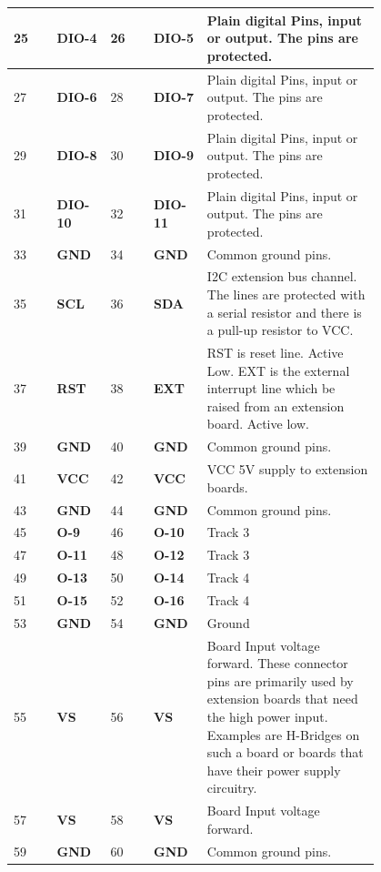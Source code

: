 \begin{longtable}{@{}|p{0.1\linewidth}|p{0.1\linewidth}|p{0.1\linewidth}|p{0.1\linewidth}|p{0.4\linewidth}|@{}}
    \midrule
    25 & \textbf{DIO-4} & 26 & \textbf{DIO-5} & Plain digital Pins, input or output. The pins are protected. \\
    \midrule
    27 & \textbf{DIO-6} & 28 & \textbf{DIO-7} & Plain digital Pins, input or output. The pins are protected. \\
    \midrule
    29 & \textbf{DIO-8} & 30 & \textbf{DIO-9} & Plain digital Pins, input or output. The pins are protected. \\
    \midrule
    31 & \textbf{DIO-10} & 32 & \textbf{DIO-11} & Plain digital Pins, input or output. The pins are protected. \\
    \midrule
    33 & \textbf{GND} & 34 & \textbf{GND} & Common ground pins. \\
    \midrule
    35 & \textbf{SCL} & 36 & \textbf{SDA} & I2C extension bus channel.  The lines are protected with a serial resistor and there is a pull-up resistor to VCC. \\
    \midrule
    37 & \textbf{RST} & 38 & \textbf{EXT} & RST is reset line. Active Low. EXT is the external interrupt line which be raised from an extension board. Active low. \\
    \midrule
    39 & \textbf{GND} & 40 & \textbf{GND} & Common ground pins. \\
    \midrule
    41 & \textbf{VCC} & 42 & \textbf{VCC} & VCC 5V supply to extension boards. \\
    \midrule
    43 & \textbf{GND} & 44 & \textbf{GND} & Common ground pins. \\
    \midrule
    45 & \textbf{O-9} & 46 & \textbf{O-10} & Track 3 \\
    \midrule
    47 & \textbf{O-11} & 48 & \textbf{O-12} & Track 3 \\
    \midrule
    49 & \textbf{O-13} & 50 & \textbf{O-14} & Track 4 \\
    \midrule
    51 & \textbf{O-15} & 52 & \textbf{O-16} & Track 4 \\
    \midrule
    53 & \textbf{GND} & 54 & \textbf{GND} & Ground \\
    \midrule
    55 & \textbf{VS} & 56 & \textbf{VS} & Board Input voltage forward. These  connector pins are primarily used by extension boards that need the high power input. Examples  are H-Bridges on such a board or boards that have their power supply circuitry. \\
    \midrule
    57 & \textbf{VS} & 58 & \textbf{VS} & Board Input voltage forward. \\
    \midrule
    59 & \textbf{GND} & 60 & \textbf{GND} & Common ground pins. \\
    \midrule
\end{longtable}  

